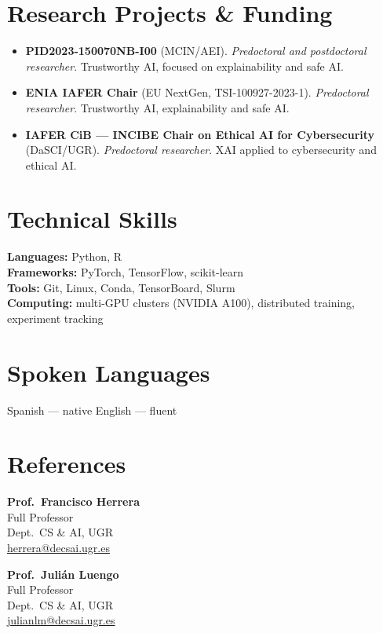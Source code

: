 \documentclass[10pt,a4paper]{article}
\newcommand{\blueitem}[1]{\textcolor{subtitleblue}{\textbf{#1}}}
\newcommand{\sub}[1]{\textcolor{subtle}{\footnotesize #1}}
\begin{document}
\section*{Research Projects \& Funding}

\begin{itemize}
    \item \textbf{PID2023-150070NB-I00} (MCIN/AEI). \emph{Predoctoral and postdoctoral researcher}. Trustworthy AI, focused on explainability and safe AI.
    \item \textbf{ENIA IAFER Chair} (EU NextGen, TSI-100927-2023-1). \emph{Predoctoral researcher}. Trustworthy AI, explainability and safe AI.
    \item \textbf{IAFER CiB --- INCIBE Chair on Ethical AI for Cybersecurity} (DaSCI/UGR). \emph{Predoctoral researcher}. XAI applied to cybersecurity and ethical AI.
\end{itemize}

\section*{Technical Skills}

\blueitem{Languages:} Python, R \\
\blueitem{Frameworks:} PyTorch, TensorFlow, scikit-learn \\
\blueitem{Tools:} Git, Linux, Conda, TensorBoard, Slurm \\
\blueitem{Computing:} multi-GPU clusters (NVIDIA A100), distributed training, experiment tracking

\section*{Spoken Languages}

Spanish --- native \quad\textbar\quad English --- fluent

\section*{References}

\begin{minipage}[t]{0.48\textwidth}
    \textbf{Prof.~Francisco Herrera} \\
    \sub{Full Professor \\ Dept.~CS \& AI, UGR \\ \href{mailto:herrera@decsai.ugr.es}{herrera@decsai.ugr.es}}
\end{minipage}\hfill
\begin{minipage}[t]{0.48\textwidth}
    \textbf{Prof.~Julián Luengo} \\
    \sub{Full Professor \\ Dept.~CS \& AI, UGR \\ \href{mailto:julianlm@decsai.ugr.es}{julianlm@decsai.ugr.es}}
\end{minipage}
\end{document}
